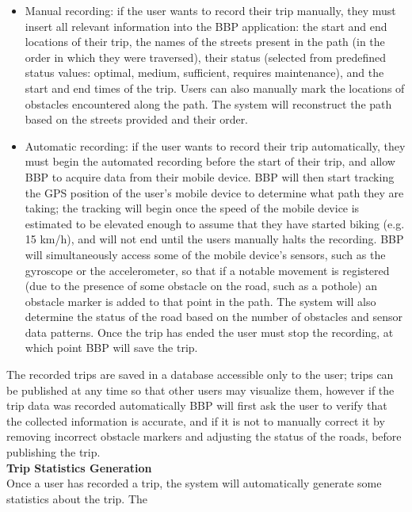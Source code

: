 \begin{itemize}
    \item Manual recording: if the user wants to record their trip manually, they must insert all relevant 
    information into the BBP application: the start and end locations of their trip, the names of the streets 
    present in the path (in the order in which they were traversed), their status (selected from predefined 
    status values: optimal, medium, sufficient, requires maintenance), and the start and end times of the trip. 
    Users can also manually mark the locations of obstacles encountered along the path. The system will 
    reconstruct the path based on the streets provided and their order.
    \item Automatic recording: if the user wants to record their trip automatically, they must begin the 
    automated recording before the start of their trip, and allow BBP to acquire data from their mobile device. 
    BBP will then start tracking the GPS position of the user's mobile device to determine what path they are 
    taking; the tracking will begin once the speed of the mobile device is estimated to be elevated enough to 
    assume that they have started biking (e.g. 15 km/h), and will not end until the users manually halts the 
    recording. BBP will simultaneously access some of the mobile device's sensors, such as the gyroscope or 
    the accelerometer, so that if a notable movement is registered (due to the presence of some obstacle on 
    the road, such as a pothole) an obstacle marker is added to that point in the path. The system will also 
    determine the status of the road based on the number of obstacles and sensor data patterns. Once the trip 
    has ended the user must stop the recording, at which point BBP will save the trip.
\end{itemize}
The recorded trips are saved in a database accessible only to the user; trips can be published at any time so 
that other users may visualize them, however if the trip data was recorded automatically BBP will first ask 
the user to verify that the collected information is accurate, and if it is not to manually correct it by 
removing incorrect obstacle markers and adjusting the status of the roads, before publishing the trip. \\
\newline
\noindent
\textbf{Trip Statistics Generation} \\
Once a user has recorded a trip, the system will automatically generate some statistics about the trip. The 
